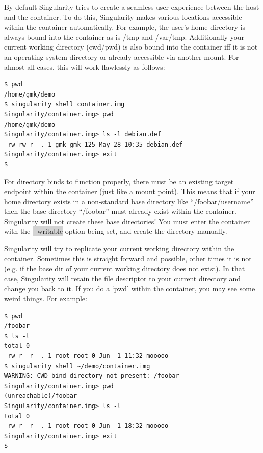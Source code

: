 \documentclass[a4paper]{article}
\newcounter{subsubsubsection}[subsubsection]
\begin{document}
By default Singularity tries to create a seamless user experience between the host and the container. To do this, Singularity makes various locations accessible within the container automatically. For example, the user’s home directory is always bound into the container as is /tmp and /var/tmp. Additionally your current working directory (cwd/pwd) is also bound into the container iff it is not an operating system directory or already accessible via another mount. For almost all cases, this will work flawlessly as follows:

\begin{lstlisting}[frame=single]
$ pwd
/home/gmk/demo
$ singularity shell container.img 
Singularity/container.img> pwd
/home/gmk/demo
Singularity/container.img> ls -l debian.def 
-rw-rw-r--. 1 gmk gmk 125 May 28 10:35 debian.def
Singularity/container.img> exit
$ 
\end{lstlisting}

For directory binds to function properly, there must be an existing target endpoint within the container (just like a mount point). This means that if your home directory exists in a non-standard base directory like “/foobar/username” then the base directory “/foobar” must already exist within the container.\\[0.1in]

Singularity will not create these base directories! You must enter the container with the \colorbox{lightgray}{-{}-writable} option being set, and create the directory manually.




Singularity will try to replicate your current working directory within the container. Sometimes this is straight forward and possible, other times it is not (e.g. if the base dir of your current working directory does not exist). In that case, Singularity will retain the file descriptor to your current directory and change you back to it. If you do a ‘pwd’ within the container, you may see some weird things. For example:

\begin{lstlisting}[frame=single]
$ pwd
/foobar
$ ls -l
total 0
-rw-r--r--. 1 root root 0 Jun  1 11:32 mooooo
$ singularity shell ~/demo/container.img 
WARNING: CWD bind directory not present: /foobar
Singularity/container.img> pwd
(unreachable)/foobar
Singularity/container.img> ls -l
total 0
-rw-r--r--. 1 root root 0 Jun  1 18:32 mooooo
Singularity/container.img> exit
$ 

\end{lstlisting}
\end{document}
